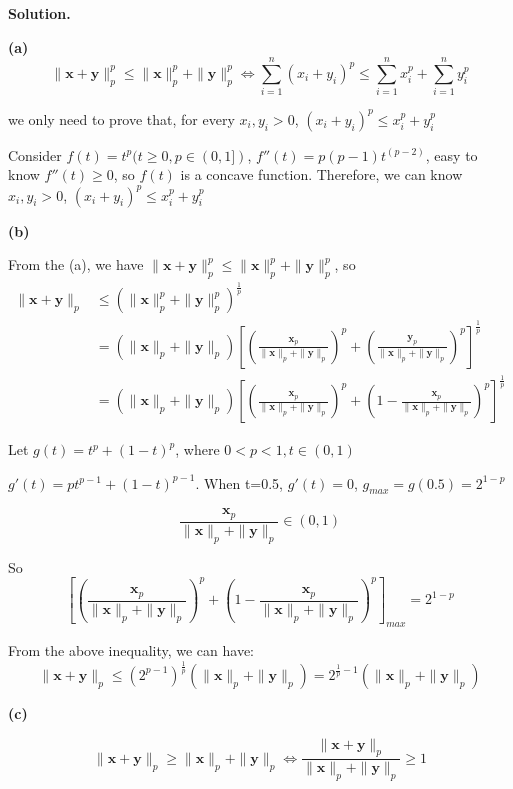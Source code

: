 \documentclass[12pt, a4paper, oneside]{ctexart}
\newenvironment{solution}{\par\noindent\textbf{Solution. }}{\par}
\begin{document}
\begin{solution}

\textbf{(a)}
$$
\| \mathbf{x}+\mathbf{y}\|_p^p \leq \| \mathbf{x}\|_p^p +\| \mathbf{y}\|_p^p \Leftrightarrow \sum_{i=1}^{n} (x_i+y_i)^p \leq \sum_{i=1}^{n} x_i^p+\sum_{i=1}^{n}y_i^p
$$

we only need to prove that, for every $x_i, y_i > 0$, $(x_i+y_i)^p \leq  x_i^p+y_i^p$

Consider $f(t)=t^p ( t \geq 0,p\in (0,1])$, $f''(t)=p(p-1)t^(p-2)$, easy to know $f''(t) \geq 0$, so $f(t)$ is a concave function. Therefore, we can know $x_i, y_i > 0$, $(x_i+y_i)^p \leq  x_i^p+y_i^p$

\vspace{12pt}

\textbf{(b)}   

From the (a), we have $\| \mathbf{x}+\mathbf{y}\|_p^p \leq \| \mathbf{x}\|_p^p +\| \mathbf{y}\|_p^p$, so
\begin{align*}
	\| \mathbf{x}+\mathbf{y}\|_p 
	&\leq (\| \mathbf{x}\|_p^p +\| \mathbf{y}\|_p^p)^\frac{1}{p} \\
	&= (\| \mathbf{x}\|_p +\| \mathbf{y}\|_p)[(\frac{\mathbf{x}_p}{\| \mathbf{x}\|_p +\| \mathbf{y}\|_p})^p+(\frac{\mathbf{y}_p}{\| \mathbf{x}\|_p +\| \mathbf{y}\|_p})^p]^\frac{1}{p} \\
	&= (\| \mathbf{x}\|_p +\| \mathbf{y}\|_p)[(\frac{\mathbf{x}_p}{\| \mathbf{x}\|_p +\| \mathbf{y}\|_p})^p+(1-\frac{\mathbf{x}_p}{\| \mathbf{x}\|_p +\| \mathbf{y}\|_p})^p]^\frac{1}{p}
\end{align*}

Let $g(t)=t^p+(1-t)^p$, where $0<p<1, t\in(0,1)$

$g'(t)=pt^{p-1}+(1-t)^{p-1} $. When t=0.5, $ g'(t)=0 $,  $g_{max}=g(0.5)=2^{1-p}$

$$\frac{\mathbf{x}_p}{\| \mathbf{x}\|_p +\| \mathbf{y}\|_p} \in (0,1)$$

So 
$$[(\frac{\mathbf{x}_p}{\| \mathbf{x}\|_p +\| \mathbf{y}\|_p})^p+(1-\frac{\mathbf{x}_p}{\| \mathbf{x}\|_p +\| \mathbf{y}\|_p})^p]_{max}=2^{1-p}$$

From the above inequality, we can have:
$$
\| \mathbf{x}+\mathbf{y}\|_p \leq (2^{p-1})^\frac{1}{p}(\| \mathbf{x}\|_p +\| \mathbf{y}\|_p) =2^{\frac{1}{p}-1}(\| \mathbf{x}\|_p +\| \mathbf{y}\|_p)
$$

\vspace{12pt}

\textbf{(c)}

$$
\| \mathbf{x}+\mathbf{y}\|_p \geq \| \mathbf{x}\|_p +\| \mathbf{y}\|_p \Leftrightarrow \frac{\| \mathbf{x}+\mathbf{y}\|_p}{\|\mathbf{x}\|_p +\| \mathbf{y}\|_p} \geq 1
$$


\end{solution}
\end{document}
